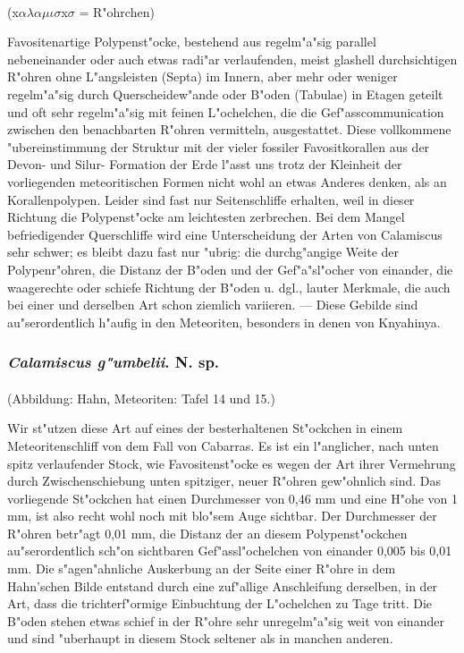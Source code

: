 \documentclass[a4paper, 11pt, oneside]{article}
\begin{document}
\paragraph{}
(x$\alpha\lambda\alpha\mu\iota\sigma$x$\sigma$ = R"ohrchen)%

Favositenartige Polypenst"ocke, bestehend aus regelm"a"sig parallel nebeneinander oder auch etwas radi"ar verlaufenden, meist glashell durchsichtigen R"ohren ohne L"angsleisten (Septa) im Innern, aber mehr oder weniger regelm"a"sig durch Querscheidew"ande oder B"oden (Tabulae) in Etagen geteilt und oft sehr regelm"a"sig mit feinen L"ochelchen, die die Gef"asscommunication zwischen den benachbarten R"ohren vermitteln, ausgestattet. Diese vollkommene "ubereinstimmung der Struktur mit der vieler fossiler Favositkorallen aus der Devon- und Silur- Formation der Erde l"asst uns trotz der Kleinheit der vorliegenden meteoritischen Formen nicht wohl an etwas Anderes denken, als an Korallenpolypen. Leider sind fast nur Seitenschliffe erhalten, weil in dieser Richtung die Polypenst"ocke am leichtesten zerbrechen. Bei dem Mangel befriedigender Querschliffe wird eine Unterscheidung der Arten von Calamiscus sehr schwer; es bleibt dazu fast nur "ubrig: die durchg"angige Weite der Polypenr"ohren, die Distanz der B"oden und der Gef"a"sl"ocher von einander, die waagerechte oder schiefe Richtung der B"oden u. dgl., lauter Merkmale, die auch bei einer und derselben Art schon ziemlich variieren. --- Diese Gebilde sind au"serordentlich h"aufig in den Meteoriten, besonders in denen von Knyahinya.
\subsubsection{\emph{Calamiscus g"umbelii}. N. sp.}
\paragraph{}
(Abbildung: Hahn, Meteoriten: Tafel 14 und 15.)

Wir st"utzen diese Art auf eines der besterhaltenen St"ockchen in einem Meteoritenschliff von dem Fall von Cabarras. Es ist ein l"anglicher, nach unten spitz verlaufender Stock, wie Favositenst"ocke es wegen der Art ihrer Vermehrung durch Zwischenschiebung unten spitziger, neuer R"ohren gew"ohnlich sind. Das vorliegende St"ockchen hat einen Durchmesser von 0,46 mm und eine H"ohe von 1 mm, ist also recht wohl noch mit blo"sem Auge sichtbar. Der Durchmesser der R"ohren betr"agt 0,01 mm, die Distanz der an diesem Polypenst"ockchen au"serordentlich sch"on sichtbaren Gef"assl"ochelchen von einander 0,005 bis 0,01 mm. Die s"agen"ahnliche Auskerbung an der Seite einer R"ohre in dem Hahn'schen Bilde entstand durch eine zuf"allige Anschleifung derselben, in der Art, dass die trichterf"ormige Einbuchtung der L"ochelchen zu Tage tritt. Die B"oden stehen etwas schief in der R"ohre sehr unregelm"a"sig weit von einander und sind "uberhaupt in diesem Stock seltener als in manchen anderen.
\end{document}
